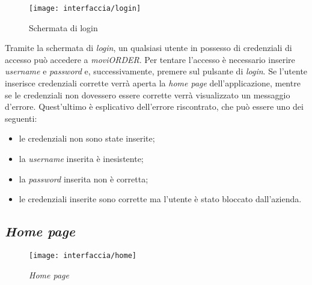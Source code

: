 \begin{figure}[!h] 
    \centering 
    \texttt{[image: interfaccia/login]} 
    \caption{Schermata di login}
\end{figure}

Tramite la schermata di \textit{login}, un qualsiasi utente in possesso di credenziali di accesso può accedere a \textit{moviORDER}. Per tentare l'accesso è necessario inserire \textit{username} e \textit{password} e, successivamente, premere sul pulsante di \textit{login}. Se l'utente inserisce credenziali corrette verrà aperta la \textit{home page} dell'applicazione, mentre se le credenziali non dovessero essere corrette verrà visualizzato un messaggio d'errore. Quest'ultimo è esplicativo dell'errore riscontrato, che può essere uno dei seguenti:
\begin{itemize}
	\item le credenziali non sono state inserite;
	\item la \textit{username} inserita è inesistente;
	\item la \textit{password} inserita non è corretta;
	\item le credenziali inserite sono corrette ma l'utente è stato bloccato dall'azienda.
\end{itemize}

\subsection{\textit{Home page}}

\begin{figure}[!h] 
    \centering 
    \texttt{[image: interfaccia/home]} 
    \caption{\textit{Home page}}
\end{figure}

